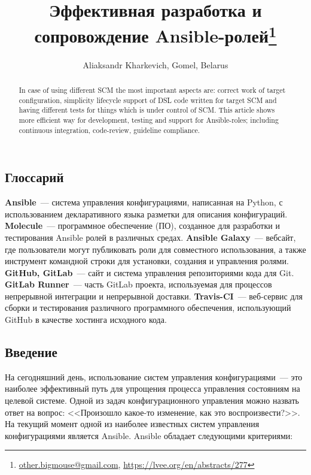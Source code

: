 \documentclass[10pt, a5paper]{article}
\begin{document}
\title{Эффективная разработка и сопровождение Ansible-ролей\footnote{\url{other.bigmouse@gmail.com}, \url{https://lvee.org/en/abstracts/277}}}
\author{Aliaksandr Kharkevich, Gomel, Belarus}
\maketitle
\begin{abstract}
In case of using different SCM the most important aspects are: correct work of target configuration, simplicity lifecycle support of DSL code written for target SCM and having different tests for things which is under control of SCM.
This article shows more efficient way for development, testing and support for Ansible-roles; including continuous integration, code-review, guideline compliance.
\end{abstract}
\subsection*{Глоссарий}

\textbf{Ansible}~--- система управления конфигурациями, написанная на Python, с использованием декларативного языка разметки для описания конфигураций.
\textbf{Molecule}~--- программное обеспечение (ПО), созданное для разработки и тестирования Ansible ролей в различных средах.
\textbf{Ansible Galaxy}~--- вебсайт, где пользователи могут публиковать роли для совместного использования, а также инструмент командной строки для установки, создания и управления ролями.
\textbf{GitHub, GitLab}~--- сайт и система управления репозиториями кода для Git.
\textbf{GitLab Runner}~--- часть GitLab проекта, используемая для процессов непрерывной интеграции и непрерывной доставки.
\textbf{Travis-CI}~--- веб-сервис для сборки и тестирования различного программного обеспечения, использующий GitHub в качестве хостинга исходного кода.

\subsection*{Введение}

На сегодняшний день, использование систем управления конфигурациями~--- это наиболее эффективный путь для упрощения процесса управления состояниям на целевой системе. Одной из задач конфигурационного управления можно назвать ответ на вопрос: <<Произошло какое-то изменение, как это воспроизвести?>>. На текущий момент одной из наиболее известных систем управления конфигурациями является Ansible.
Ansible обладает следующими критериями:
\end{document}

